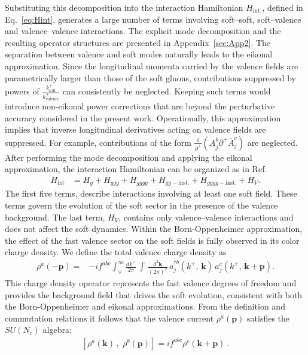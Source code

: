 \documentclass[a4paper,11pt]{article}
\begin{document}
Substituting this decomposition into the interaction Hamiltonian $H_{\text{int.}}$, defined in Eq.~\eqref{eq:Hint}, generates a large number of terms involving soft–soft, soft–valence and valence–valence interactions. The explicit mode decomposition and the resulting operator structures are presented in Appendix~\ref{sec:App2}. The separation between valence and soft modes naturally leads to the eikonal approximation. Since the longitudinal momenta carried by the valence fields are parametrically larger than those of the soft gluons, contributions suppressed by powers of $\frac{k^{+}_{\text{soft}}}{k^{+}_{\text{valence}}}$ can consistently be neglected. Keeping such terms would introduce non-eikonal power corrections that are beyond the perturbative accuracy considered in the present work. Operationally, this approximation implies that inverse longitudinal derivatives acting on valence fields are suppressed. For example, contributions of the form $\frac{1}{\partial^{+}}\left(\underline{A}_{j}^{b}\partial^{+}\overline{A}_{j}^{c}\right)$ are neglected. After performing the mode decomposition and applying the eikonal approximation, the interaction Hamiltonian can be organized as in Ref.~\cite{Lublinsky:2016meo}
\begin{align} \label{eq: expandH}
H_{\text{int}}& = H_{g}+H_{ggg}+H_{gggg}+H_{gg-\text{inst.}}+H_{gggg-\text{inst.}}+H_{V}.
\end{align}
The first five terms, describe interactions involving at least one soft field. These terms govern the evolution of the soft sector in the presence of the valence background. The last term, $H_{V}$, contains only valence–valence interactions and does not affect the soft dynamics. Within the Born-Oppenheimer approximation, the effect of the fast valence sector on the soft fields is fully observed in its color charge density. We define the total valence charge density as
\begin{align}
   \rho^{a}(-\mathbf{p}) =  & -if^{abc}\int_{\vee}^{\infty}\frac{dk^{+}}{2\pi}\,\int\,\frac{d^{2}\mathbf{k}}{(2\pi)^{2}}\, a_{j}^{\dagger b}(k^{+},\, \mathbf{k})\, a_{j}^{c}(k^{+},\, \mathbf{k}+\mathbf{p}).
\end{align}
This charge density operator represents the fast valence degrees of freedom and provides the background field that drives the soft evolution, consistent with both the Born-Oppenheimer and eikonal approximations. From the definition and commutation relations it follows that the valence current $\rho^{a}(\mathbf{p})$ satisfies the $SU(N_{c})$ algebra:
 \begin{align}\label{rhoalge}
\left[\rho^{a}(\mathbf{k})\,,\,\,\rho^{b}(\mathbf{p})\right]=if^{abc}\rho^{c}(\mathbf{k}+\mathbf{p})\:.
  \end{align}
\end{document}
